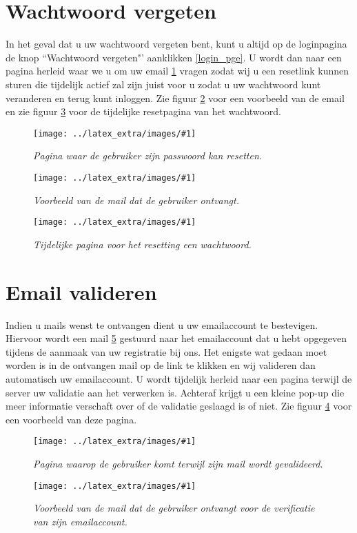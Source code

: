 \documentclass[11pt,twoside,a4paper]{report}
\newcommand*{\copyimageH}[4]{ 			%
	\begin{figure}[Ht]
	\texttt{[image: ../latex\_extra/images/\#1]}
	\caption{\textit{#4}}\label{#2}
	\end{figure}
}
\begin{document}
\section{Wachtwoord vergeten}
In het geval dat u uw wachtwoord vergeten bent, kunt u altijd op de loginpagina de knop ``Wachtwoord vergeten"' aanklikken \ref{login_pge}. U wordt dan naar een pagina herleid waar we u om uw email \ref{frgt_pass} vragen zodat wij u een resetlink kunnen sturen die tijdelijk actief zal zijn juist voor u zodat u uw wachtwoord kunt veranderen en terug kunt inloggen. Zie figuur \ref{frgt_pass_mail} voor een voorbeeld van de email en zie figuur \ref{rst_pass} voor de tijdelijke resetpagina van het wachtwoord.
\copyimageH{forgot_password.jpg}{frgt_pass}{\textwidth}{Pagina waar de gebruiker zijn passwoord kan resetten.}
\copyimageH{forgot_password_mail.jpg}{frgt_pass_mail}{\textwidth}{Voorbeeld van de mail dat de gebruiker ontvangt.}
\copyimageH{reset_password.jpg}{rst_pass}{\textwidth}{Tijdelijke pagina voor het resetting een wachtwoord.}

\section{Email valideren}
Indien u mails wenst te ontvangen dient u uw emailaccount te bestevigen. Hiervoor wordt een mail \ref{mail_ver_mail} gestuurd naar het emailaccount dat u hebt opgegeven tijdens de aanmaak van uw registratie bij ons. Het enigste wat gedaan moet worden is in de ontvangen mail op de link te klikken en wij valideren dan automatisch uw emailaccount. U wordt tijdelijk herleid naar een pagina terwijl de server uw validatie aan het verwerken is. Achteraf krijgt u een kleine pop-up die meer informatie verschaft over of de validatie geslaagd is of niet. Zie figuur \ref{mail_ver} voor een voorbeeld van deze pagina. 
\copyimageH{mail_verify.jpg}{mail_ver}{\textwidth}{Pagina waarop de gebruiker komt terwijl zijn mail wordt gevalideerd.}
\copyimageH{mail_verify_mail.jpg}{mail_ver_mail}{\textwidth}{Voorbeeld van de mail dat de gebruiker ontvangt voor de verificatie van zijn emailaccount.}

	
	
	
\end{document}
